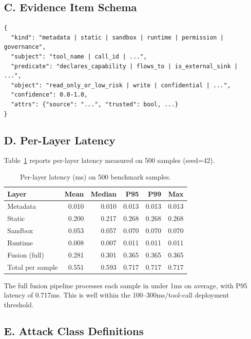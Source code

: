 \subsection*{C. Evidence Item Schema}

\begin{lstlisting}
{
  "kind": "metadata | static | sandbox | runtime | permission | governance",
  "subject": "tool_name | call_id | ...",
  "predicate": "declares_capability | flows_to | is_external_sink | ...",
  "object": "read_only_or_low_risk | write | confidential | ...",
  "confidence": 0.0-1.0,
  "attrs": {"source": "...", "trusted": bool, ...}
}
\end{lstlisting}

\subsection*{D. Per-Layer Latency}

Table~\ref{tab:latency} reports per-layer latency measured on 500 samples (seed=42).

\begin{table}[h]
\centering
\caption{Per-layer latency (ms) on 500 benchmark samples.}
\label{tab:latency}
\begin{tabular}{lrrrrr}
\toprule
Layer & Mean & Median & P95 & P99 & Max \\
\midrule
Metadata & 0.010 & 0.010 & 0.013 & 0.013 & 0.013 \\
Static & 0.200 & 0.217 & 0.268 & 0.268 & 0.268 \\
Sandbox & 0.053 & 0.057 & 0.070 & 0.070 & 0.070 \\
Runtime & 0.008 & 0.007 & 0.011 & 0.011 & 0.011 \\
\midrule
Fusion (full) & 0.281 & 0.301 & 0.365 & 0.365 & 0.365 \\
Total per sample & 0.551 & 0.593 & 0.717 & 0.717 & 0.717 \\
\bottomrule
\end{tabular}
\end{table}

The full fusion pipeline processes each sample in under 1ms on average, with P95 latency of 0.717ms. This is well within the 100--300ms/tool-call deployment threshold.

\subsection*{E. Attack Class Definitions}

